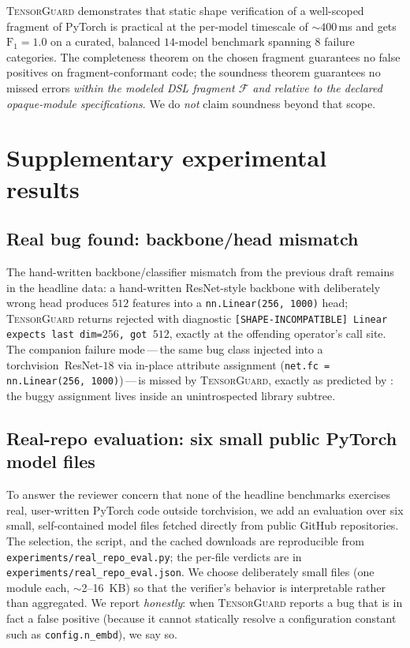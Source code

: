 \documentclass{article}
\theoremstyle{definition}
\begin{document}
\textsc{TensorGuard} demonstrates that static shape verification
of a well-scoped fragment of PyTorch is practical at the per-model
timescale of $\sim\!400$\,ms and gets $\mathrm{F}_1=1.0$ on a
curated, balanced $14$-model benchmark spanning $8$ failure
categories. The completeness theorem on the chosen fragment
guarantees no false positives on fragment-conformant code; the
soundness theorem guarantees no missed errors \emph{within the
modeled DSL fragment $\mathcal F$ and relative to the declared
opaque-module specifications}. We do \emph{not} claim soundness
beyond that scope.

\appendix

\section{Supplementary experimental results}\label{app:supp}

\subsection{Real bug found: backbone/head mismatch}
\label{sec:realbug}

The hand-written backbone/classifier mismatch from the previous
draft remains in the headline data: a hand-written ResNet-style
backbone with deliberately wrong head produces $512$ features
into a \verb|nn.Linear(256, 1000)| head; \textsc{TensorGuard}
returns \textsf{rejected} with diagnostic
\texttt{[SHAPE-INCOMPATIBLE] Linear expects last dim=$256$, got
$512$}, exactly at the offending operator's call site. The
companion failure mode\,---\,the same bug class injected into a
torchvision~ResNet-$18$ via in-place attribute assignment
(\verb|net.fc = nn.Linear(256, 1000)|)\,---\,is missed by
\textsc{TensorGuard}, exactly as predicted by
: the buggy assignment lives inside an
unintrospected library subtree.

\subsection{Real-repo evaluation: six small public PyTorch model files}
\label{sec:realrepo}

To answer the reviewer concern that none of the headline benchmarks
exercises real, user-written PyTorch code outside torchvision, we
add an evaluation over six small, self-contained model files
fetched directly from public GitHub repositories. The selection,
the script, and the cached downloads are reproducible from
\verb|experiments/real_repo_eval.py|; the per-file verdicts are in
\verb|experiments/real_repo_eval.json|. We choose deliberately
small files (one module each, $\sim$2--16~KB) so that the
verifier's behavior is interpretable rather than aggregated. We
report \emph{honestly}: when \textsc{TensorGuard} reports a bug
that is in fact a false positive (because it cannot statically
resolve a configuration constant such as \verb|config.n_embd|), we
say so.
\end{document}
